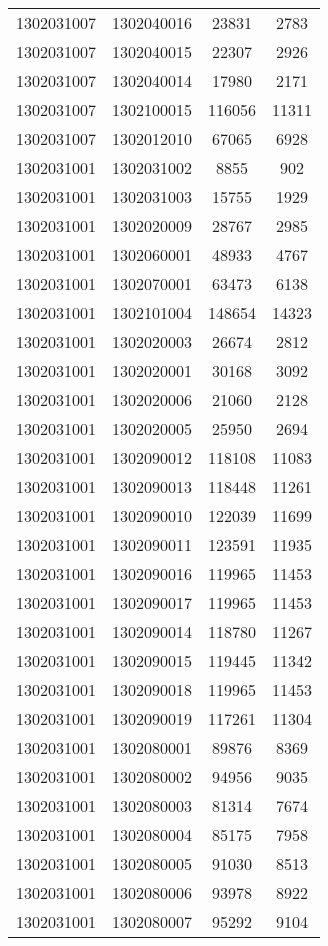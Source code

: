 \begin{longtable}{llcc}
1302031007 & 1302040016 & 23831 & 2783\\
1302031007 & 1302040015 & 22307 & 2926\\
1302031007 & 1302040014 & 17980 & 2171\\
1302031007 & 1302100015 & 116056 & 11311\\
1302031007 & 1302012010 & 67065 & 6928\\
1302031001 & 1302031002 & 8855 & 902\\
1302031001 & 1302031003 & 15755 & 1929\\
1302031001 & 1302020009 & 28767 & 2985\\
1302031001 & 1302060001 & 48933 & 4767\\
1302031001 & 1302070001 & 63473 & 6138\\
1302031001 & 1302101004 & 148654 & 14323\\
1302031001 & 1302020003 & 26674 & 2812\\
1302031001 & 1302020001 & 30168 & 3092\\
1302031001 & 1302020006 & 21060 & 2128\\
1302031001 & 1302020005 & 25950 & 2694\\
1302031001 & 1302090012 & 118108 & 11083\\
1302031001 & 1302090013 & 118448 & 11261\\
1302031001 & 1302090010 & 122039 & 11699\\
1302031001 & 1302090011 & 123591 & 11935\\
1302031001 & 1302090016 & 119965 & 11453\\
1302031001 & 1302090017 & 119965 & 11453\\
1302031001 & 1302090014 & 118780 & 11267\\
1302031001 & 1302090015 & 119445 & 11342\\
1302031001 & 1302090018 & 119965 & 11453\\
1302031001 & 1302090019 & 117261 & 11304\\
1302031001 & 1302080001 & 89876 & 8369\\
1302031001 & 1302080002 & 94956 & 9035\\
1302031001 & 1302080003 & 81314 & 7674\\
1302031001 & 1302080004 & 85175 & 7958\\
1302031001 & 1302080005 & 91030 & 8513\\
1302031001 & 1302080006 & 93978 & 8922\\
1302031001 & 1302080007 & 95292 & 9104\\

\end{longtable}
